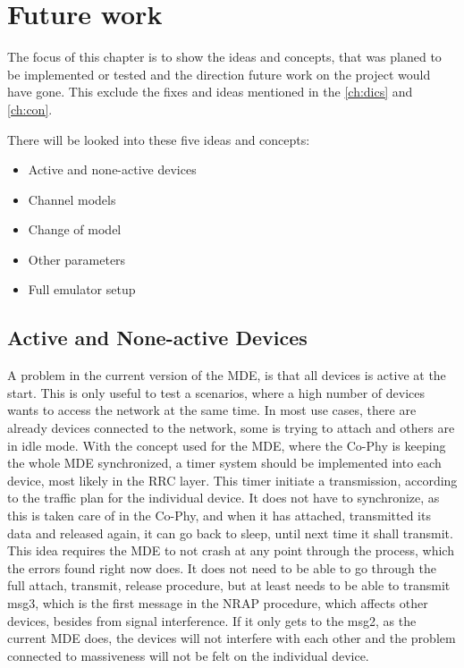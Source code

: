 \chapter{Future work}
\label{ch:Future}
The focus of this chapter is to show the ideas and concepts, that was planed to be implemented or tested and the direction future work on the project would have gone. This exclude the fixes and ideas mentioned in the \autoref{ch:dics} and \autoref{ch:con}.

There will be looked into these five ideas and concepts:

\begin{itemize}
\item Active and none-active devices
\item Channel models
\item Change of model
\item Other parameters
\item Full emulator setup
\end{itemize}


\section{Active and None-active Devices}
A problem in the current version of the MDE, is that all devices is active at the start. This is only useful to test a scenarios, where a high number of devices wants to access the network at the same time. In most use cases, there are already devices connected to the network, some is trying to attach and others are in idle mode. With the concept used for the MDE, where the Co-Phy is keeping the whole MDE synchronized, a timer system should be implemented into each device, most likely in the RRC layer. This timer initiate a transmission, according to the traffic plan for the individual device. It does not have to synchronize, as this is taken care of in the Co-Phy, and when it has attached, transmitted its data and released again, it can go back to sleep, until next time it shall transmit. This idea requires the MDE to not crash at any point through the process, which the errors found right now does. It does not need to be able to go through the full attach, transmit, release procedure, but at least needs to be able to transmit msg3, which is the first message in the NRAP procedure, which affects other devices, besides from signal interference. If it only gets to the msg2, as the current MDE does, the devices will not interfere with each other and the problem connected to massiveness will not be felt on the individual device.

